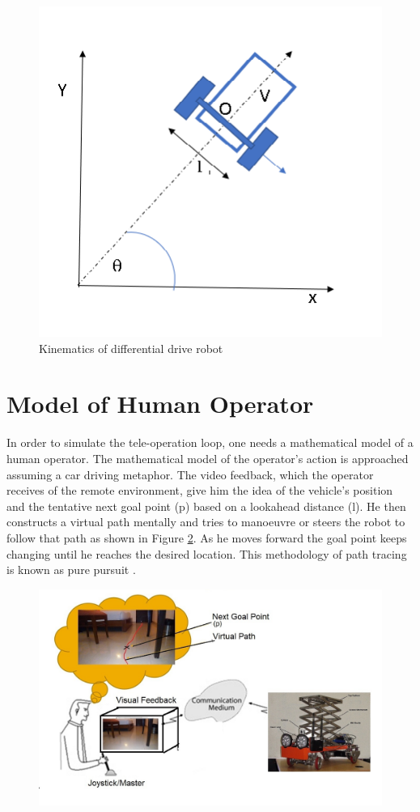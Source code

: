 \begin{figure}
	\includegraphics{Chapter5/fig/RobotKine}
		\caption{Kinematics of differential drive robot}
		\label{fig:stdRobKine}
\end{figure}
\section{Model of Human Operator}
In order to simulate the tele-operation loop, one needs a mathematical model of a human operator. The mathematical  model of the operator's action is approached assuming a car driving metaphor.
 The video feedback, which the operator receives of the remote environment, give him the idea of the vehicle's  position and the tentative next goal point (p) based on a lookahead distance (l). He then constructs a  virtual path mentally and tries to manoeuvre or steers the robot to follow that path as shown in Figure \ref{fig:drivingStratagy}. As he moves forward the goal point keeps changing until he reaches the desired location. This methodology of path tracing is known as pure pursuit \cite{coulter1992implementation}. 
\begin{figure}
	\includegraphics[width=\linewidth,keepaspectratio]{Chapter6/fig/mentalMap}
	\label{fig:drivingStratagy} 
\end{figure}

